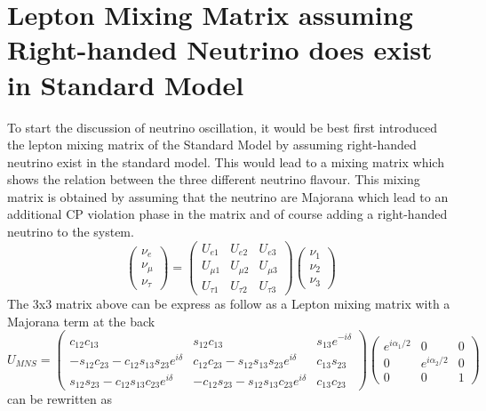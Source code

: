 \documentclass[11pt ,a4paper]{article}
\begin{document}
\section*{Lepton Mixing Matrix assuming Right-handed Neutrino does exist in Standard Model}
To start the discussion of neutrino oscillation, it would be best first introduced the lepton mixing matrix of the Standard Model by assuming right-handed neutrino exist in the standard model. This would lead to a mixing matrix which shows the relation between the three different neutrino flavour. This mixing matrix is obtained by assuming that the neutrino are Majorana which lead to an additional CP violation phase in the matrix and of course adding a right-handed neutrino to the system.\cite{king07}
	\begin{equation}
	\begin{pmatrix}
	\nu_e\\\nu_{\mu}\\\nu_{\tau} 
	\end{pmatrix}
	=\begin{pmatrix}
	U_{e1}&U_{e2}&U_{e3}\\U_{\mu1}&U_{\mu2}&U_{\mu3}\\U_{\tau1}&U_{\tau2}&U_{\tau3}
	\end{pmatrix}
	\begin{pmatrix}
	\nu_1\\\nu_2\\\nu_3
	\end{pmatrix}
	\end{equation}
The 3x3 matrix above can be express as follow as a Lepton mixing matrix with a Majorana term at the back
\begin{equation}
U_{MNS}=
\begin{pmatrix}
c_{12}c_{13}&s_{12}c_{13}&s_{13}e^{-i\delta}\\
-s_{12}c_{23}-c_{12}s_{13}s_{23}e^{i\delta} & c_{12}c_{23}-s_{12}s_{13}s_{23}e^{i\delta} &c_{13}s_{23}\\
s_{12}s_{23}-c_{12}s_{13}c_{23}e^{i\delta} &-c_{12}s_{23}-s_{12}s_{13}c_{23}e^{i\delta} & c_{13}c_{23}
\end{pmatrix}
\begin{pmatrix}
e^{i\alpha_1/2}&0&0\\0&e^{i\alpha_2/2}&0\\0&0&1
\end{pmatrix}
\end{equation}
\cite{globalfit} can be rewritten as
\end{document}
